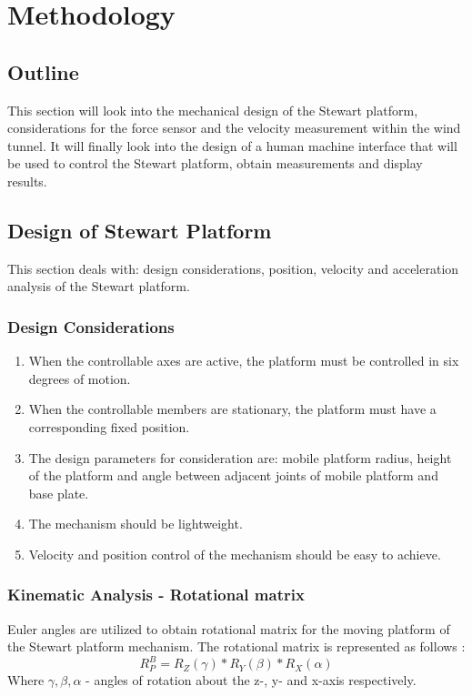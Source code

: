 \chapter{Methodology}
\section{Outline}
This section will look into the mechanical design of the Stewart platform, considerations for the force sensor and the velocity measurement within the wind tunnel. It will finally look into the design of a human machine interface that will be used to control the Stewart platform, obtain measurements and display results.

\section{Design of Stewart Platform}
This section deals with: design considerations, position, velocity and acceleration analysis of the Stewart platform.
\subsection{Design Considerations}
\begin{enumerate}
\item When the controllable axes are active, the platform must be controlled in six degrees of motion.
\item When the controllable members are stationary, the
platform must have a corresponding fixed position.
\item The design parameters for consideration are: mobile platform radius, height of the platform and angle between adjacent joints of mobile platform and base plate.
\item The mechanism should be lightweight.
\item Velocity and position control of the mechanism should be easy to achieve.
\end{enumerate}
\subsection{Kinematic Analysis - Rotational matrix}
Euler angles are utilized to obtain rotational matrix for the moving platform of the Stewart platform mechanism. The rotational matrix is represented as follows \cite{csumnu2017simulation}:
\begin{equation}
 R_{P}^B = R_{Z}(\gamma)*R_{Y}(\beta)*R_{X}(\alpha)
\end{equation}
Where $\gamma, \beta, \alpha$ - angles of rotation about the z-, y- and x-axis respectively.

